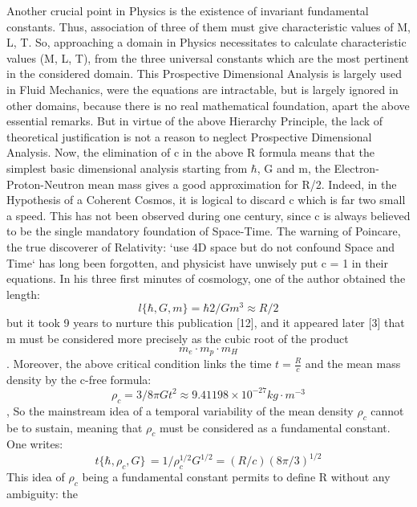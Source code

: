 \documentclass[twoside,draft]{article}
\begin{document}
\begin{sloppypar}
{Another crucial point in Physics is the existence of invariant fundamental constants. Thus,
association of three of them must give characteristic values of M, L, T. So, approaching a domain in
Physics necessitates to calculate characteristic values (M, L, T), from the three universal constants
which are the most pertinent in the considered domain. This Prospective Dimensional Analysis is
largely used in Fluid Mechanics, were the equations are intractable, but is largely ignored in other
domains, because there is no real mathematical foundation, apart the above essential remarks. But
in virtue of the above Hierarchy Principle, the lack of theoretical justification is not a reason to
neglect Prospective Dimensional Analysis.
Now, the elimination of c in the above R formula means that the simplest basic dimensional
analysis starting from $\hbar$, G and m, the Electron-Proton-Neutron mean mass gives a good
approximation for R/2. Indeed, in the Hypothesis of a Coherent Cosmos, it is logical to discard c
which is far two small a speed. This has not been observed during one century, since c is always
believed to be the single mandatory foundation of Space-Time. The warning of Poincare, the true
discoverer of Relativity: `use 4D space but do not confound Space and Time` has long been
forgotten, and physicist have unwisely put c = 1 in their equations.
In his three first minutes of cosmology, one of the author obtained the length:
\begin{equation}
l \{\hbar,G,m\} = \hbar 2 /Gm^{3} \approx R/2
\end{equation}
but it took 9 years to nurture this publication [12], and it appeared later [3] that m must be considered more precisely as the cubic root of the product 
\begin{equation}
m_{e} \cdot m_{p} \cdot m_{H}
\end{equation}. Moreover, the above critical condition
links the time $t = \frac{R}{c}$ and the mean mass density by the c-free formula:
\begin{equation}
\rho_{c} = 3/8\pi Gt^{2} \approx 9.41198 \times 10^{-27} kg \cdot m^{-3}
\end{equation}
, So the mainstream idea of a temporal variability of the mean density $\rho_{c}$ cannot be to
sustain, meaning that $\rho_{c}$ must be considered as a fundamental constant. One writes:
\begin{equation}
t\{\hbar,\rho_{c} ,G\}\, = 1/\rho_{c}^{1/2} G^{1/2} = (R/c) (8\pi/3)^{1/2}
\end{equation}
This idea of $\rho_{c}$ being a fundamental constant permits to define R without any ambiguity: the
}
\end{sloppypar}
\end{document}

